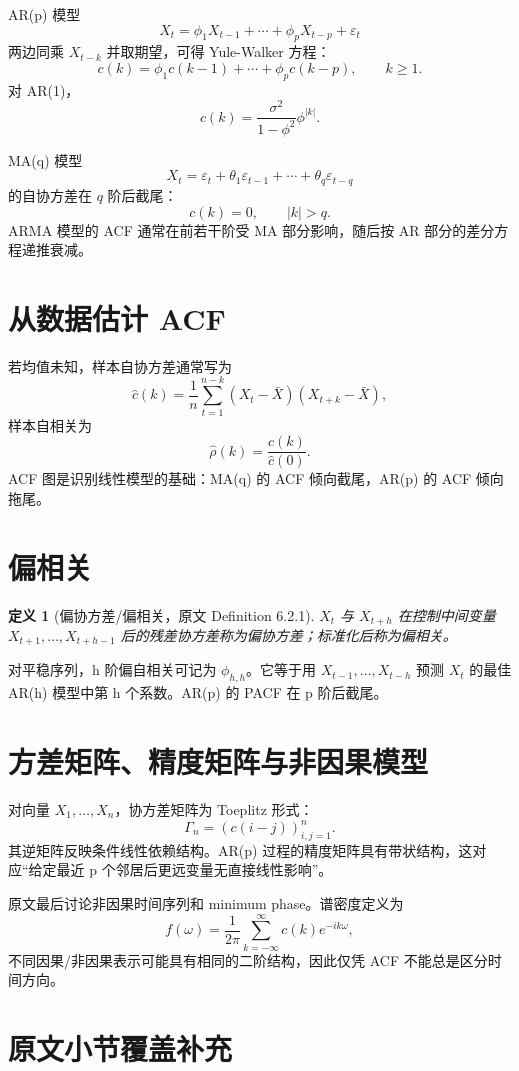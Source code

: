 \documentclass[11pt,a4paper,openany]{ctexbook}
\newtheorem{definition}{定义}[section]
\begin{document}
AR(p) 模型
\[
  X_t=\phi_1X_{t-1}+\cdots+\phi_pX_{t-p}+\varepsilon_t
\]
两边同乘 \(X_{t-k}\) 并取期望，可得 Yule-Walker 方程：
\[
  c(k)=\phi_1c(k-1)+\cdots+\phi_pc(k-p),\qquad k\ge1.
\]
对 AR(1)，
\[
  c(k)=\frac{\sigma^2}{1-\phi^2}\phi^{|k|}.
\]

MA(q) 模型
\[
  X_t=\varepsilon_t+\theta_1\varepsilon_{t-1}+\cdots+\theta_q\varepsilon_{t-q}
\]
的自协方差在 \(q\) 阶后截尾：
\[
  c(k)=0,\qquad |k|>q.
\]
ARMA 模型的 ACF 通常在前若干阶受 MA 部分影响，随后按 AR 部分的差分方程递推衰减。

\section{从数据估计 ACF}

若均值未知，样本自协方差通常写为
\[
  \hat c(k)=\frac1n\sum_{t=1}^{n-k}(X_t-\bar X)(X_{t+k}-\bar X),
\]
样本自相关为
\[
  \hat\rho(k)=\frac{\hat c(k)}{\hat c(0)}.
\]
ACF 图是识别线性模型的基础：MA(q) 的 ACF 倾向截尾，AR(p) 的 ACF 倾向拖尾。

\section{偏相关}

\begin{definition}[偏协方差/偏相关，原文 Definition 6.2.1]
\(X_t\) 与 \(X_{t+h}\) 在控制中间变量 \(X_{t+1},\ldots,X_{t+h-1}\) 后的残差协方差称为偏协方差；标准化后称为偏相关。
\end{definition}

对平稳序列，h 阶偏自相关可记为 \(\phi_{h,h}\)。它等于用 \(X_{t-1},\ldots,X_{t-h}\) 预测 \(X_t\) 的最佳 AR(h) 模型中第 h 个系数。AR(p) 的 PACF 在 p 阶后截尾。

\section{方差矩阵、精度矩阵与非因果模型}

对向量 \(X_1,\ldots,X_n\)，协方差矩阵为 Toeplitz 形式：
\[
  \Gamma_n=(c(i-j))_{i,j=1}^n.
\]
其逆矩阵反映条件线性依赖结构。AR(p) 过程的精度矩阵具有带状结构，这对应“给定最近 p 个邻居后更远变量无直接线性影响”。

原文最后讨论非因果时间序列和 minimum phase。谱密度定义为
\[
  f(\omega)=\frac1{2\pi}\sum_{k=-\infty}^{\infty}c(k)e^{-ik\omega},
\]
不同因果/非因果表示可能具有相同的二阶结构，因此仅凭 ACF 不能总是区分时间方向。

\section{原文小节覆盖补充}
\end{document}
